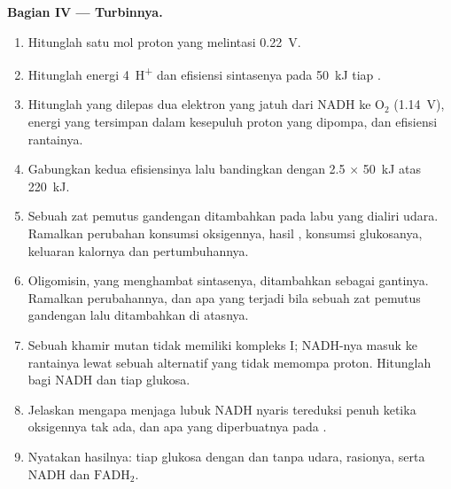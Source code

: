 \begin{problem}
\medskip
\noindent\textbf{Bagian IV --- Turbinnya.}
\begin{enumerate}[resume]
  \item Hitunglah  satu mol proton yang melintasi  \qty{0.22}{V}.
  \item Hitunglah energi \qty{4}{H^+} dan efisiensi sintasenya pada
        \qty{50}{kJ} tiap .
  \item Hitunglah  yang dilepas dua elektron yang jatuh
        dari NADH ke $\mathrm{O_2}$ (\qty{1.14}{V}), energi yang
        tersimpan dalam kesepuluh proton yang dipompa, dan efisiensi
        rantainya.
  \item Gabungkan kedua efisiensinya lalu bandingkan dengan 2.5 
        $\times$ \qty{50}{kJ} atas \qty{220}{kJ}.
  \item Sebuah zat pemutus gandengan ditambahkan pada labu yang dialiri
        udara. Ramalkan perubahan konsumsi oksigennya, hasil ,
        konsumsi glukosanya, keluaran kalornya dan pertumbuhannya.
  \item Oligomisin, yang menghambat sintasenya, ditambahkan sebagai
        gantinya. Ramalkan perubahannya, dan apa yang terjadi bila
        sebuah zat pemutus gandengan lalu ditambahkan di atasnya.
  \item Sebuah khamir mutan tidak memiliki kompleks I; NADH-nya masuk
        ke rantainya lewat sebuah  alternatif yang tidak memompa
        proton. Hitunglah  bagi NADH dan  tiap
        glukosa.
  \item Jelaskan mengapa  menjaga lubuk NADH  nyaris
        tereduksi penuh ketika oksigennya tak ada, dan apa yang
        diperbuatnya pada .
  \item Nyatakan hasilnya:  tiap glukosa dengan dan tanpa udara,
        rasionya, serta  NADH dan $\mathrm{FADH_2}$.
\end{enumerate}
\end{problem}
